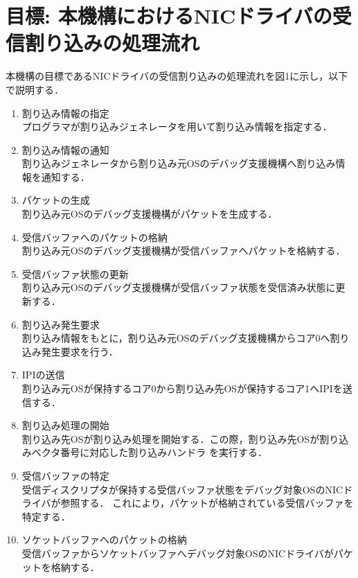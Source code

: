 \documentclass[12pt]{jsarticle}
\begin{document}
\section{目標: 本機構におけるNICドライバの受信割り込みの処理流れ}
本機構の目標であるNICドライバの受信割り込みの処理流れを図1に示し，以下で説明する．
\begin{enumerate}
\item 割り込み情報の指定\\
プログラマが割り込みジェネレータを用いて割り込み情報を指定する．
\item 割り込み情報の通知\\
割り込みジェネレータから割り込み元OSのデバッグ支援機構へ割り込み情報を通知する．
\item パケットの生成\\
割り込み元OSのデバッグ支援機構がパケットを生成する．
\item 受信バッファへのパケットの格納\\
割り込み元OSのデバッグ支援機構が受信バッファへパケットを格納する．
\item 受信バッファ状態の更新\\
割り込み元OSのデバッグ支援機構が受信バッファ状態を受信済み状態に更新する．
\item 割り込み発生要求\\
割り込み情報をもとに，割り込み元OSのデバッグ支援機構からコア0へ割り込み発生要求を行う．
\item IPIの送信\\
割り込み元OSが保持するコア0から割り込み先OSが保持するコア1へIPIを送信する．
\item 割り込み処理の開始\\
割り込み先OSが割り込み処理を開始する．この際，割り込み先OSが割り込みベクタ番号に対応した割り込みハンドラ
を実行する．
\item 受信バッファの特定\\
受信ディスクリプタが保持する受信バッファ状態をデバッグ対象OSのNICドライバが参照する．
これにより，パケットが格納されている受信バッファを特定する．
\item ソケットバッファへのパケットの格納\\
受信バッファからソケットバッファへデバッグ対象OSのNICドライバがパケットを格納する．
\end{enumerate}
\end{document}
